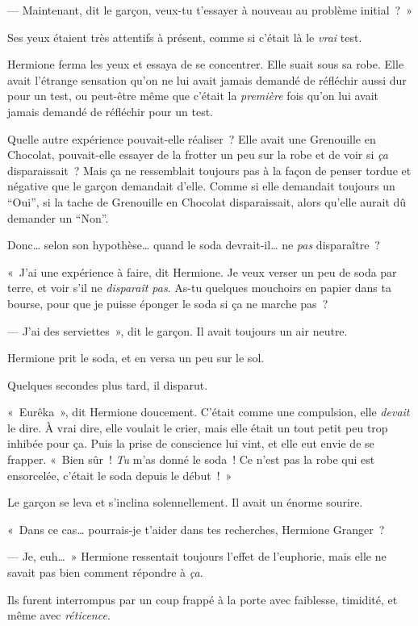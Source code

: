 --- Maintenant, dit le garçon, veux-tu t'essayer à nouveau au problème initial~?~»

Ses yeux étaient très attentifs à présent, comme si c'était là le \emph{vrai} test.

Hermione ferma les yeux et essaya de se concentrer. Elle suait sous sa robe. Elle avait l'étrange sensation qu'on ne lui avait jamais demandé de réfléchir aussi dur pour un test, ou peut-être même que c'était la \emph{première} fois qu'on lui avait jamais demandé de réfléchir pour un test.

Quelle autre expérience pouvait-elle réaliser~? Elle avait une Grenouille en Chocolat, pouvait-elle essayer de la frotter un peu sur la robe et de voir si \emph{ça} disparaissait~? Mais ça ne ressemblait toujours pas à la façon de penser tordue et négative que le garçon demandait d'elle. Comme si elle demandait toujours un “Oui”, si la tache de Grenouille en Chocolat disparaissait, alors qu'elle aurait dû demander un “Non”.

Donc… selon son hypothèse… quand le soda devrait-il… ne \emph{pas} disparaître~?

«~J'ai une expérience à faire, dit Hermione. Je veux verser un peu de soda par terre, et voir s'il ne \emph{disparaît pas}. As-tu quelques mouchoirs en papier dans ta bourse, pour que je puisse éponger le soda si ça ne marche pas~?

--- J'ai des serviettes~», dit le garçon. Il avait toujours un air neutre.

Hermione prit le soda, et en versa un peu sur le sol.

Quelques secondes plus tard, il disparut.

«~Eurêka~», dit Hermione doucement. C'était comme une compulsion, elle \emph{devait} le dire. À vrai dire, elle voulait le crier, mais elle était un tout petit peu trop inhibée pour ça. Puis la prise de conscience lui vint, et elle eut envie de se frapper. «~Bien sûr~! \emph{Tu} m'as donné le soda~! Ce n'est pas la robe qui est ensorcelée, c'était le soda depuis le début~!~»

Le garçon se leva et s'inclina solennellement. Il avait un énorme sourire.

«~Dans ce cas… pourrais-je t'aider dans tes recherches, Hermione Granger~?

--- Je, euh…~» Hermione ressentait toujours l'effet de l'euphorie, mais elle ne savait pas bien comment répondre à \emph{ça}.

Ils furent interrompus par un coup frappé à la porte avec faiblesse, timidité, et même avec \emph{réticence}.

